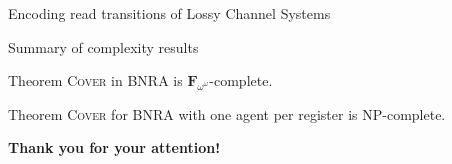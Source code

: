 \documentclass{beamer}
\newcommand{\COVER}{\textsc{Cover}\xspace}
\begin{document}
\begin{frame}{Encoding read transitions of Lossy Channel Systems}
	\centering
	 
\end{frame}

\begin{frame}{Summary of complexity results}

	\begin{block}{Theorem}
		{\COVER} in BNRA is $\mathbf{F}_{\omega^\omega}$-complete.
	\end{block}
		
	\pause
	\begin{block}{Theorem}
	\COVER{} for BNRA with one agent per register is NP-complete. 
	\end{block}
\end{frame}

\begin{frame}{}
	
	\Huge \textbf{Thank you for your attention!}
	
\end{frame}
\end{document}
